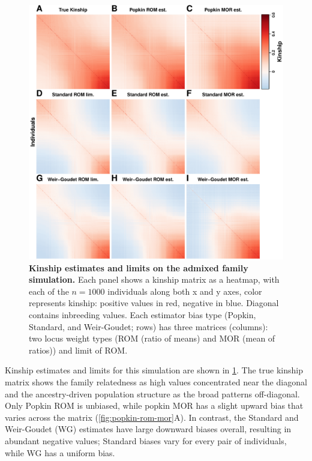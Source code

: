 \documentclass[11pt]{article}
\begin{document}
\begin{linenumbers}
\begin{figure}[bp!]
  \centering
  \includegraphics[height=0.8\textheight]{sim-admix-n1000-m100000-k3-f0.3-s0.5-mc100-h0.8-g20-fes/kinship.pdf}
  \caption{
    {\bf Kinship estimates and limits on the admixed family simulation.}
    Each panel shows a kinship matrix as a heatmap, with each of the $n=1000$ individuals along both x and y axes, color represents kinship: positive values in red, negative in blue.
    Diagonal contains inbreeding values.
    Each estimator bias type (Popkin, Standard, and Weir-Goudet; rows) has three matrices (columns): two locus weight types (ROM (ratio of means) and MOR (mean of ratios)) and limit of ROM.
  }
  \label{fig:kinship_sim}
\end{figure}

Kinship estimates and limits for this simulation are shown in \cref{fig:kinship_sim}.
The true kinship matrix shows the family relatedness as high values concentrated near the diagonal and the ancestry-driven population structure as the broad patterns off-diagonal.
Only Popkin ROM is unbiased, while popkin MOR has a slight upward bias that varies across the matrix (\cref{fig:popkin-rom-mor}A).
In contrast, the Standard and Weir-Goudet (WG) estimates have large downward biases overall, resulting in abundant negative values; Standard biases vary for every pair of individuals, while WG has a uniform bias.


\end{linenumbers}
\end{document}
